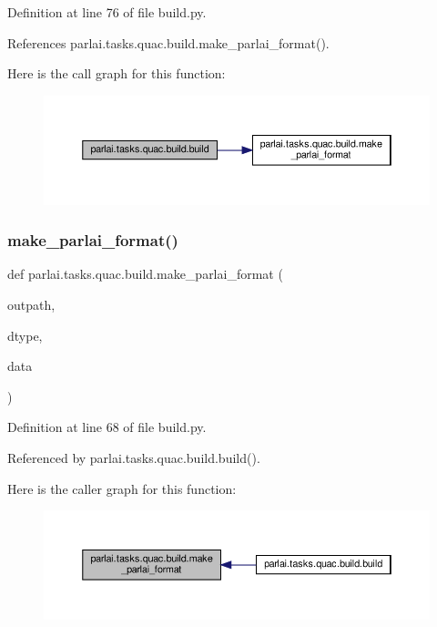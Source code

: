 Definition at line 76 of file build.\+py.



References parlai.\+tasks.\+quac.\+build.\+make\+\_\+parlai\+\_\+format().

Here is the call graph for this function\+:
\nopagebreak
\begin{figure}[H]
\begin{center}
\leavevmode
\includegraphics[width=350pt]{namespaceparlai_1_1tasks_1_1quac_1_1build_a86e9b7d4a167a4dc22e925770ce42824_cgraph}
\end{center}
\end{figure}
\mbox{\label{namespaceparlai_1_1tasks_1_1quac_1_1build_a08c212462b5c58cde91192d35f24f0cc}} 
\subsubsection{\texorpdfstring{make\+\_\+parlai\+\_\+format()}{make\_parlai\_format()}}
{\footnotesize\ttfamily def parlai.\+tasks.\+quac.\+build.\+make\+\_\+parlai\+\_\+format (\begin{DoxyParamCaption}\item[{}]{outpath,  }\item[{}]{dtype,  }\item[{}]{data }\end{DoxyParamCaption})}



Definition at line 68 of file build.\+py.



Referenced by parlai.\+tasks.\+quac.\+build.\+build().

Here is the caller graph for this function\+:
\nopagebreak
\begin{figure}[H]
\begin{center}
\leavevmode
\includegraphics[width=350pt]{namespaceparlai_1_1tasks_1_1quac_1_1build_a08c212462b5c58cde91192d35f24f0cc_icgraph}
\end{center}
\end{figure}


